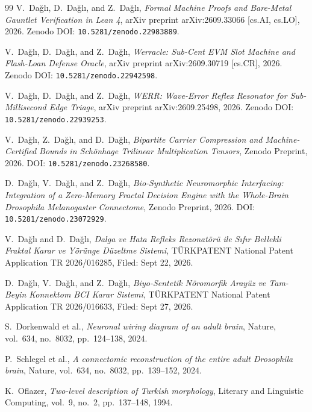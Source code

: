 \documentclass[11pt,a4paper]{article}
\begin{document}
\begin{thebibliography}{99}
V.~Da\u{g}l\i, D.~Da\u{g}l\i, and Z.~Da\u{g}l\i,
\textit{Formal Machine Proofs and Bare-Metal Gauntlet Verification in Lean 4},
arXiv preprint arXiv:2609.33066 [cs.AI, cs.LO], 2026. Zenodo DOI: \texttt{10.5281/zenodo.22983889}.

V.~Da\u{g}l\i, D.~Da\u{g}l\i, and Z.~Da\u{g}l\i,
\textit{Werracle: Sub-Cent EVM Slot Machine and Flash-Loan Defense Oracle},
arXiv preprint arXiv:2609.30719 [cs.CR], 2026. Zenodo DOI: \texttt{10.5281/zenodo.22942598}.

V.~Da\u{g}l\i, D.~Da\u{g}l\i, and Z.~Da\u{g}l\i,
\textit{WERR: Wave-Error Reflex Resonator for Sub-Millisecond Edge Triage},
arXiv preprint arXiv:2609.25498, 2026. Zenodo DOI: \texttt{10.5281/zenodo.22939253}.

V.~Da\u{g}l\i, Z.~Da\u{g}l\i, and D.~Da\u{g}l\i,
\textit{Bipartite Carrier Compression and Machine-Certified Bounds in Sch\"{o}nhage Trilinear Multiplication Tensors},
Zenodo Preprint, 2026. DOI: \texttt{10.5281/zenodo.23268580}.

D.~Da\u{g}l\i, V.~Da\u{g}l\i, and Z.~Da\u{g}l\i,
\textit{Bio-Synthetic Neuromorphic Interfacing: Integration of a Zero-Memory Fractal Decision Engine with the Whole-Brain Drosophila Melanogaster Connectome},
Zenodo Preprint, 2026. DOI: \texttt{10.5281/zenodo.23072929}.

V.~Da\u{g}l\i{} and D.~Da\u{g}l\i,
\textit{Dalga ve Hata Refleks Rezonat\"{o}r\"{u} ile S\i{}f\i{}r Bellekli Fraktal Karar ve Y\"{o}r\"{u}nge D\"{u}zeltme Sistemi},
T\"{U}RKPATENT National Patent Application TR 2026/016285, Filed: Sept 22, 2026.

D.~Da\u{g}l\i, V.~Da\u{g}l\i, and Z.~Da\u{g}l\i,
\textit{Biyo-Sentetik N\"{o}romorfik Aray\"{u}z ve Tam-Beyin Konnektom BCI Karar Sistemi},
T\"{U}RKPATENT National Patent Application TR 2026/016633, Filed: Sept 27, 2026.

S.~Dorkenwald et al.,
\textit{Neuronal wiring diagram of an adult brain},
Nature, vol.~634, no.~8032, pp.~124--138, 2024.

P.~Schlegel et al.,
\textit{A connectomic reconstruction of the entire adult Drosophila brain},
Nature, vol.~634, no.~8032, pp.~139--152, 2024.

K.~Oflazer,
\textit{Two-level description of Turkish morphology},
Literary and Linguistic Computing, vol.~9, no.~2, pp.~137--148, 1994.


\end{thebibliography}
\end{document}
